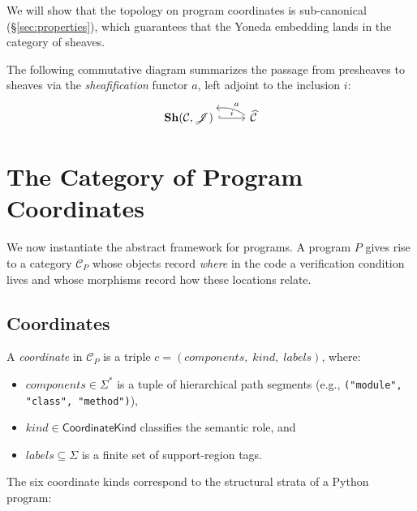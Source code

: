 \documentclass[11pt]{article}
\begin{document}
We will show that the topology on program coordinates is sub-canonical
(\S\ref{sec:properties}), which guarantees that the Yoneda embedding lands
in the category of sheaves.

The following commutative diagram summarizes the passage from presheaves to
sheaves via the \emph{sheafification} functor $a$, left adjoint to the
inclusion $i$:
\[
\begin{tikzcd}
  \mathbf{Sh}(\mathcal{C}, \mathscr{J})
    \arrow[r, hook, "i"]
  & \widehat{\mathcal{C}}
    \arrow[l, bend right=20, "a"']
\end{tikzcd}
\]

\section{The Category of Program Coordinates}\label{sec:coordinates}

We now instantiate the abstract framework for programs.  A program $P$ gives
rise to a category $\mathcal{C}_P$ whose objects record \emph{where} in the
code a verification condition lives and whose morphisms record how these
locations relate.

\subsection{Coordinates}

\begin{definition}[Coordinate]\label{def:coordinate}
A \emph{coordinate} in $\mathcal{C}_P$ is a triple
$c = (\mathit{components},\; \mathit{kind},\; \mathit{labels})$, where:
\begin{itemize}[nosep]
  \item $\mathit{components} \in \Sigma^*$ is a tuple of hierarchical path
        segments (e.g., \texttt{("module", "class", "method")}),
  \item $\mathit{kind} \in \mathsf{CoordinateKind}$ classifies the semantic
        role, and
  \item $\mathit{labels} \subseteq \Sigma$ is a finite set of support-region
        tags.
\end{itemize}
\end{definition}

The six coordinate kinds correspond to the structural strata of a Python program:
\end{document}
